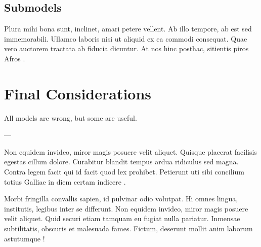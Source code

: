 \section{Submodels}

Plura mihi bona sunt, inclinet, amari petere vellent. Ab illo tempore, ab est sed immemorabili. Ullamco laboris nisi ut aliquid ex ea commodi consequat. Quae vero auctorem tractata ab fiducia dicuntur. At nos hinc posthac, sitientis piros Afros \autocite{ballot2000}.


\chapter{Final Considerations}

\begingroup
  \setlength{}
  \epigraph{All models are wrong, but some are useful.}{--- \textcite{box1979}}
\endgroup

Non equidem invideo, miror magis posuere velit aliquet. Quisque placerat facilisis egestas cillum dolore. Curabitur blandit tempus ardua ridiculus sed magna. Contra legem facit qui id facit quod lex prohibet. Petierunt uti sibi concilium totius Galliae in diem certam indicere \autocite{gilbert2000}.

Morbi fringilla convallis sapien, id pulvinar odio volutpat. Hi omnes lingua, institutis, legibus inter se differunt. Non equidem invideo, miror magis posuere velit aliquet. Quid securi etiam tamquam eu fugiat nulla pariatur. Inmensae subtilitatis, obscuris et malesuada fames. Fictum, deserunt mollit anim laborum astutumque \autocite{epstein2006}!


\postextual

\begingroup
  \renewcommand{\baselinestretch}{1}
  \setcounter{footnote}{0}
  \renewcommand{\thefootnote}{\fnsymbol{footnote}}
  \printbibliography[heading=bibheading]
\endgroup

\tocskipone
\tocprintchapternonum
{}


